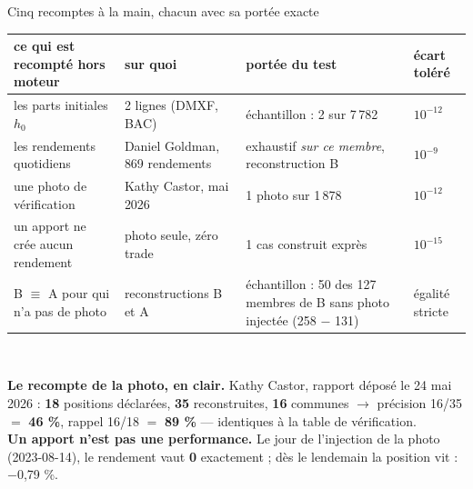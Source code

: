 \documentclass[11pt,aspectratio=169]{beamer}
\begin{document}
\begin{frame}{Cinq recomptes à la main, chacun avec sa portée exacte}
  \centering\scriptsize
  \begin{tabular}{p{4.3cm}p{3.5cm}p{3.3cm}l}
    \toprule
    ce qui est recompté hors moteur & sur quoi & portée du test & écart toléré\\
    \midrule
    les parts initiales $h_0$ & 2 lignes (DMXF, BAC) & échantillon : 2 sur 7\,782 & $10^{-12}$\\
    les rendements quotidiens & Daniel Goldman, 869 rendements & exhaustif \emph{sur ce membre},
      reconstruction B & $10^{-9}$\\
    une photo de vérification & Kathy Castor, mai 2026 & 1 photo sur 1\,878 & $10^{-12}$\\
    un apport ne crée aucun rendement & photo seule, zéro trade & 1 cas construit exprès & $10^{-15}$\\
    B $\equiv$ A pour qui n'a pas de photo & reconstructions B et A & échantillon : 50 des 127
      membres de B sans photo injectée (258 $-$ 131) & égalité stricte\\
    \bottomrule
  \end{tabular}\\[3mm]
  \raggedright\footnotesize
  \textbf{Le recompte de la photo, en clair.} Kathy Castor, rapport déposé le 24 mai 2026 :
  \textbf{18} positions déclarées, \textbf{35} reconstruites, \textbf{16} communes
  $\rightarrow$ précision 16/35 $=$ \textbf{46 \%}, rappel 16/18 $=$ \textbf{89 \%} --- identiques à
  la table de vérification.\\[1.5mm]
  \textbf{Un apport n'est pas une performance.} Le jour de l'injection de la photo (2023-08-14),
  le rendement vaut \textbf{0} exactement ; dès le lendemain la position vit : $-$0,79 \%.
\end{frame}
\end{document}

